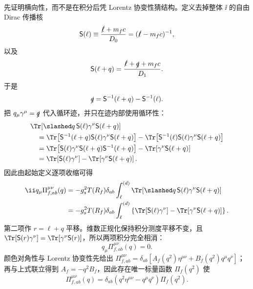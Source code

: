\begin{derivation}[夸克圈对规范耦合的修正]
先证明横向性，而不是在积分后凭 Lorentz 协变性猜结构。定义去掉整体 $\ii$ 的自由 Dirac 传播核
\begin{equation*}
 \mathsf S(\ell)
 \equiv\frac{\slashed\ell+m_fc}{D_0}
 =(\slashed\ell-m_fc)^{-1},
\end{equation*}
以及
\begin{equation*}
 \mathsf S(\ell+q)
 =\frac{\slashed\ell+\slashed q+m_fc}{D_1}.
\end{equation*}
于是
\begin{equation*}
 \slashed q
 =\mathsf S^{-1}(\ell+q)-\mathsf S^{-1}(\ell).
\end{equation*}
把 $q_\mu\gamma^\mu=\slashed q$ 代入循环迹，并只在迹内部使用循环性：
\begin{align*}
 &\Tr\!\left[
 \slashed q\,\mathsf S(\ell)\gamma^\nu\mathsf S(\ell+q)
 \right]\\
 &\quad=
 \Tr\!\left[
 \mathsf S^{-1}(\ell+q)\mathsf S(\ell)
 \gamma^\nu\mathsf S(\ell+q)
 \right]
 -\Tr\!\left[
 \mathsf S^{-1}(\ell)\mathsf S(\ell)
 \gamma^\nu\mathsf S(\ell+q)
 \right]\\
 &\quad=
 \Tr\!\left[
 \mathsf S(\ell)\gamma^\nu
 \mathsf S(\ell+q)\mathsf S^{-1}(\ell+q)
 \right]
 -\Tr\!\left[
 \gamma^\nu\mathsf S(\ell+q)
 \right]\\
 &\quad=
 \Tr\!\left[\mathsf S(\ell)\gamma^\nu\right]
 -\Tr\!\left[\gamma^\nu\mathsf S(\ell+q)\right].
\end{align*}
因此由起始定义逐项收缩可得
\begin{align*}
 \ii q_\mu\Pi_{f,ab}^{\mu\nu}(q)
 &=-g_s^2T(R_f)\delta_{ab}
 \int_\ell^{(d)}
 \Tr\!\left[
 \slashed q\,\mathsf S(\ell)\gamma^\nu\mathsf S(\ell+q)
 \right]\\
 &=-g_s^2T(R_f)\delta_{ab}
 \int_\ell^{(d)}
 \left\{
 \Tr[\mathsf S(\ell)\gamma^\nu]
 -\Tr[\gamma^\nu\mathsf S(\ell+q)]
 \right\}.
\end{align*}
第二项作 $r=\ell+q$ 平移。维数正规化保持积分测度平移不变，且 $\Tr[\mathsf S(r)\gamma^\nu]=\Tr[\gamma^\nu\mathsf S(r)]$，所以两项积分完全相消：
\begin{equation*}
 q_\mu\Pi_{f,ab}^{\mu\nu}(q)=0.
\end{equation*}
颜色对角性与 Lorentz 协变性先给出 $\Pi_{f,ab}^{\mu\nu}=\delta_{ab}[A_f(q^2)\eta^{\mu\nu}+B_f(q^2)q^\mu q^\nu]$；再与上式联立得到 $A_f=-q^2B_f$，因此存在唯一标量函数 $\Pi_f(q^2)$ 使
\begin{equation*}
 \Pi_{f,ab}^{\mu\nu}(q)
 =\delta_{ab}(q^2\eta^{\mu\nu}-q^\mu q^\nu)\Pi_f(q^2).
\end{equation*}


\end{derivation}
